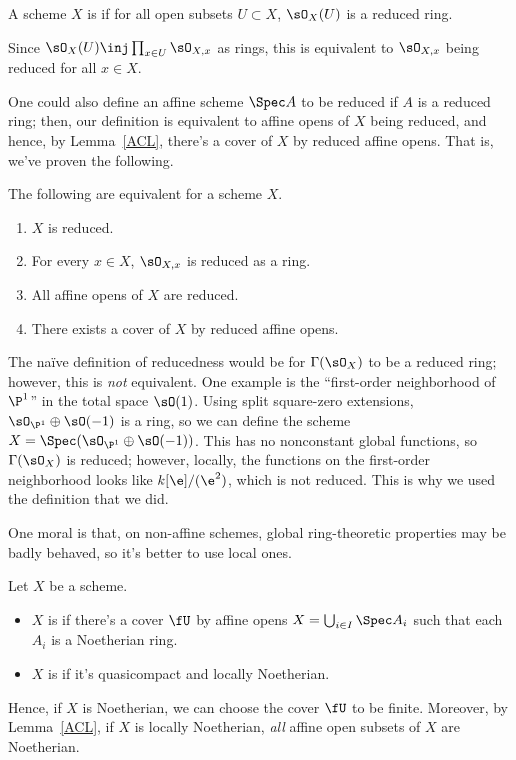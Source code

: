 \begin{defn}
A scheme \(X\) is  if for all open subsets \(U\subset X\), \(\sO_X(U)\) is a reduced ring.
\end{defn}
Since \(\sO_X(U)\inj\prod_{x\in U}\sO_{X,x}\) as rings, this is equivalent to \(\sO_{X,x}\) being reduced for all
\(x\in X\).

One could also define an affine scheme \(\Spec A\) to be reduced if \(A\) is a reduced ring; then, our definition
is equivalent to affine opens of \(X\) being reduced, and hence, by Lemma~\ref{ACL}, there's a cover of \(X\) by
reduced affine opens. That is, we've proven the following.
\begin{cor}
The following are equivalent for a scheme \(X\).
\begin{enumerate}
	\item \(X\) is reduced.
	\item For every \(x\in X\), \(\sO_{X,x}\) is reduced as a ring.
	\item All affine opens of \(X\) are reduced.
	\item There exists a cover of \(X\) by reduced affine opens.
\end{enumerate}
\end{cor}
The naïve definition of reducedness would be for \(\Gamma(\sO_X)\) to be a reduced ring; however, this is
\emph{not} equivalent. One example is the ``first-order neighborhood of \(\P^1\)'' in the total space \(\sO(1)\).
Using split square-zero extensions, \(\sO_{\P^1}\oplus\sO(-1)\) is a ring, so we can define the scheme
\(X = \Spec(\sO_{\P^1}\oplus\sO(-1))\). This has no nonconstant global functions, so \(\Gamma(\sO_X)\) is reduced;
however, locally, the functions on the first-order neighborhood looks like \(k[\e]/(\e^2)\), which is not reduced.
This is why we used the definition that we did.

One moral is that, on non-affine schemes, global ring-theoretic properties may be badly behaved, so it's better to
use local ones.
\begin{defn}
Let \(X\) be a scheme.
\begin{itemize}
	\item \(X\) is  if there's a cover \(\fU\) by affine opens \(X = \bigcup_{i\in I}
	\Spec A_i\) such that each \(A_i\) is a Noetherian ring.
	\item \(X\) is  if it's quasicompact and locally Noetherian.
\end{itemize}
\end{defn}
Hence, if \(X\) is Noetherian, we can choose the cover \(\fU\) to be finite. Moreover, by Lemma~\ref{ACL}, if \(X\)
is locally Noetherian, \emph{all} affine open subsets of \(X\) are Noetherian.

